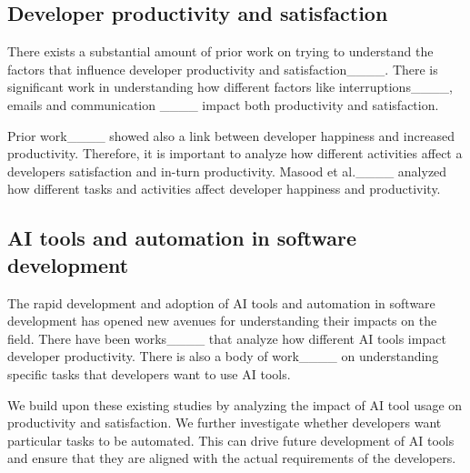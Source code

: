 \subsection{Developer productivity and satisfaction}
There exists a substantial amount of prior work on trying to understand the factors that influence developer productivity and satisfaction____. There is significant work in understanding how different factors like interruptions____, emails and communication ____ impact both productivity and satisfaction.

Prior work____ showed also a link between developer happiness and increased productivity. Therefore, it is important to analyze how different activities affect a developers satisfaction and in-turn productivity. Masood et al.____ analyzed how different tasks and activities affect developer happiness and productivity. 


\subsection{AI tools and automation in software development}

The rapid development and adoption of AI tools and automation in software development has opened new avenues for understanding their impacts on the field. There have been works____ that analyze how different AI tools impact developer productivity. There is also a body of work____ on understanding specific tasks that developers want to use AI tools. 

We build upon these existing studies by analyzing the impact of AI tool usage on productivity and satisfaction. We further investigate whether developers want particular tasks to be automated. This can drive future development of AI tools and ensure that they are aligned with the actual requirements of the developers.